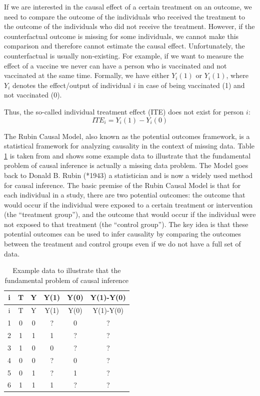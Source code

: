 \documentclass[
  12pt,
  oneside]{book}
\theoremstyle{definition}
\theoremstyle{definition}
\theoremstyle{definition}
\theoremstyle{definition}
\theoremstyle{remark}
\begin{document}
If we are interested in the causal effect of a certain treatment on an outcome, we need to compare the outcome of the individuals who received the treatment to the outcome of the individuals who did not receive the treatment. However, if the counterfactual outcome is missing for some individuals, we cannot make this comparison and therefore cannot estimate the causal effect. Unfortunately, the counterfactual is usually non-existing.
For example, if we want to measure the effect of a vaccine we never can have a person who is vaccinated and not vaccinated at the same time. Formally, we have either \(Y_i(1)\) or \(Y_i(1)\), where \(Y_i\) denotes the effect/output of individual \(i\) in case of being vaccinated (1) and not vaccinated (0).

Thus, the so-called individual treatment effect (ITE) does not exist for person \(i\):
\[
ITE_i=Y_i(1)-Y_i(0)
\]

The Rubin Causal Model, also known as the potential outcomes framework, is a statistical framework for analyzing causality in the context of missing data.
Table \ref{tab:tab21} is taken from \citet{Neal2020Introduction} and shows some example data to illustrate that the fundamental problem of causal inference is actually a missing data problem.
The Model goes back to Donald B. Rubin (*1943) a statistician and is now a widely used method for causal inference. The basic premise of the Rubin Causal Model is that for each individual in a study, there are two potential outcomes: the outcome that would occur if the individual were exposed to a certain treatment or intervention (the ``treatment group''), and the outcome that would occur if the individual were not exposed to that treatment (the ``control group''). The key idea is that these potential outcomes can be used to infer causality by comparing the outcomes between the treatment and control groups even if we do not have a full set of data.

\begin{longtable}[]{@{}cccccc@{}}
\caption{\label{tab:tab21} Example data to illustrate that the fundamental problem of causal inference}\tabularnewline
\toprule()
i & T & Y & Y(1) & Y(0) & Y(1)-Y(0) \\
\midrule()
\endfirsthead
\toprule()
i & T & Y & Y(1) & Y(0) & Y(1)-Y(0) \\
\midrule()
\endhead
1 & 0 & 0 & ? & 0 & ? \\
2 & 1 & 1 & 1 & ? & ? \\
3 & 1 & 0 & 0 & ? & ? \\
4 & 0 & 0 & ? & 0 & ? \\
5 & 0 & 1 & ? & 1 & ? \\
6 & 1 & 1 & 1 & ? & ? \\
\bottomrule()
\end{longtable}
\end{document}
